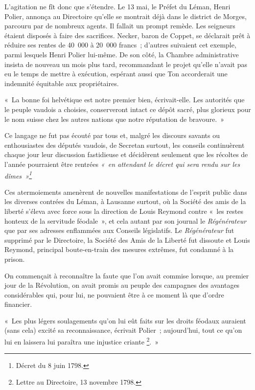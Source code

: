 \documentclass[french,twoside]{book} %
\newenvironment{quoteblock}%
  {\begin{quoting}}
  {\end{quoting}}
\newenvironment{quotebar}{%
    \def\FrameCommand{{\color{rubric!10!}\vrule width 0.5em} \hspace{0.9em}}%
    \def\OuterFrameSep{\itemsep} %
    \MakeFramed {\advance\hsize-\width \FrameRestore}
  }%
  {%
    \endMakeFramed
  }
\renewenvironment{quoteblock}%
  {%
    \savenotes
    \setstretch{0.9}
    \normalfont
    \begin{quotebar}
  }
  {%
    \end{quotebar}
    \spewnotes
  }
\begin{document}
L’agitation ne fît donc que s’étendre. Le 13 mai, le Préfet du Léman, Henri Polier, annonça au Directoire qu’elle se montrait déjà dans le district de Morges, parcouru par de nombreux agents. Il fallait un prompt remède. Les seigneurs étaient disposés à faire des sacrifices. Necker, baron de Coppet, se déclarait prêt à réduire ses rentes de 40 000 à 20 000 francs ; d’autres suivaient cet exemple, parmi lesquels Henri Polier lui-même. De son côté, la Chambre administrative insista de nouveau un mois plus tard, recommandant le projet qu’elle n’avait pas eu le temps de mettre à exécution, espérant aussi que Ton accorderait une indemnité équitable aux propriétaires.\par

\begin{quoteblock}
\noindent « La bonne foi helvétique est notre premier bien, écrivait-elle. Les autorités que le peuple vaudois a choisies, conserveront intact ce dépôt sacré, plus glorieux pour le nom suisse chez les autres nations que notre réputation de bravoure. »\end{quoteblock}

\noindent Ce langage ne fut pas écouté par tous et, malgré les discours savants ou enthousiastes des députés vaudois, de Secretan surtout, les conseils continuèrent chaque jour leur discussion fastidieuse et décidèrent seulement que les récoltes de l’année pourraient être rentrées \emph{« en attendant le décret qui sera rendu sur les dîmes »\footnote{Décret du 8 juin 1798.} }\par
Ces atermoiements amenèrent de nouvelles manifestations de l’esprit public dans les diverses contrées du Léman, à Lausanne surtout, où la Société des amis de la liberté s’éleva avec force sous la direction de Louis Reymond contre « les restes honteux de la servitude féodale », et cela autant par son journal le \emph{Régénérateur} que par ses adresses enflammées aux Conseils législatifs. Le \emph{Régénérateur} fut supprimé par le Directoire, la Société des Amis de la Liberté fut dissoute et Louis Reymond, principal boute-en-train des mesures extrêmes, fut condamné à la prison.\par
On commençait à reconnaître la faute que l’on avait commise lorsque, au premier jour de la Révolution, on avait promis au peuple des campagnes des avantages considérables qui, pour lui, ne pouvaient être à ce moment là que d’ordre financier.\par

\begin{quoteblock}
 \noindent « Les plus légers soulagements qu’on lui eût faits sur les droits féodaux auraient (sans cela) excité sa reconnaissance, écrivait Polier ; aujourd’hui, tout ce qu’on lui en laissera lui paraîtra une injustice criante \footnote{Lettre au Directoire, 13 novembre 1798.}. »
 \end{quoteblock}
\end{document}
